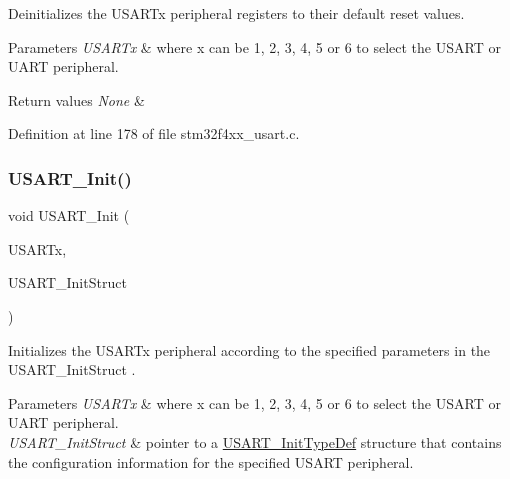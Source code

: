 Deinitializes the U\+S\+A\+R\+Tx peripheral registers to their default reset values. 


\begin{DoxyParams}{Parameters}
{\em U\+S\+A\+R\+Tx} & where x can be 1, 2, 3, 4, 5 or 6 to select the U\+S\+A\+RT or U\+A\+RT peripheral. \\
\hline
\end{DoxyParams}

\begin{DoxyRetVals}{Return values}
{\em None} & \\
\hline
\end{DoxyRetVals}


Definition at line 178 of file stm32f4xx\+\_\+usart.\+c.

\mbox{\label{group___u_s_a_r_t___group1_ga98da340ea0324002ba1b4263e91ab2ff}} 
\subsubsection{\texorpdfstring{U\+S\+A\+R\+T\+\_\+\+Init()}{USART\_Init()}}
{\footnotesize\ttfamily void U\+S\+A\+R\+T\+\_\+\+Init (\begin{DoxyParamCaption}\item[{\hyperlink{struct_u_s_a_r_t___type_def}{U\+S\+A\+R\+T\+\_\+\+Type\+Def} $\ast$}]{U\+S\+A\+R\+Tx,  }\item[{\hyperlink{struct_u_s_a_r_t___init_type_def}{U\+S\+A\+R\+T\+\_\+\+Init\+Type\+Def} $\ast$}]{U\+S\+A\+R\+T\+\_\+\+Init\+Struct }\end{DoxyParamCaption})}



Initializes the U\+S\+A\+R\+Tx peripheral according to the specified parameters in the U\+S\+A\+R\+T\+\_\+\+Init\+Struct . 


\begin{DoxyParams}{Parameters}
{\em U\+S\+A\+R\+Tx} & where x can be 1, 2, 3, 4, 5 or 6 to select the U\+S\+A\+RT or U\+A\+RT peripheral. \\
\hline
{\em U\+S\+A\+R\+T\+\_\+\+Init\+Struct} & pointer to a \hyperlink{struct_u_s_a_r_t___init_type_def}{U\+S\+A\+R\+T\+\_\+\+Init\+Type\+Def} structure that contains the configuration information for the specified U\+S\+A\+RT peripheral. \\
\hline
\end{DoxyParams}


